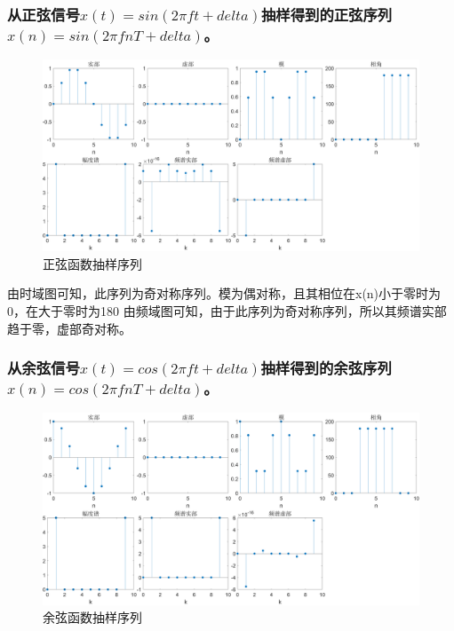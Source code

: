 \documentclass{../source/Experiment}
\begin{document}
\subsubsection{从正弦信号$x(t)=sin(2\pi ft+delta)$抽样得到的正弦序列$x(n)=sin(2\pi fnT+delta)$。}

\begin{figure}[H]
    \centering
    \includegraphics[width = \textwidth]{src/2_1_3.png}
    \caption{正弦函数抽样序列}
\end{figure}

由时域图可知，此序列为奇对称序列。模为偶对称，且其相位在x(n)小于零时为0，在大于零时为180\degree
由频域图可知，由于此序列为奇对称序列，所以其频谱实部趋于零，虚部奇对称。

\subsubsection{从余弦信号$x(t)=cos(2\pi ft+delta)$抽样得到的余弦序列$x(n)=cos(2\pi fnT+delta)$。}

\begin{figure}[H]
    \centering
    \includegraphics[width = \textwidth]{src/2_1_4.png}
    \caption{余弦函数抽样序列}
\end{figure}
\end{document}
